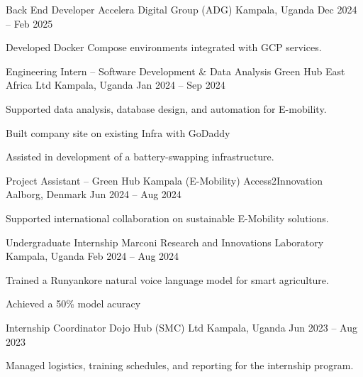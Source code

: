 \begin{cventries}
      \cventry
        {Back End Developer}
        {Accelera Digital Group (ADG)}
        {Kampala, Uganda}
        {Dec 2024 -- Feb 2025}
        {
          \begin{cvitems}
            \item Developed Docker Compose environments integrated with GCP services.
          \end{cvitems}
        }
    
      \cventry
        {Engineering Intern – Software Development \& Data Analysis}
        {Green Hub East Africa Ltd}
        {Kampala, Uganda}
        {Jan 2024 -- Sep 2024}
        {
          \begin{cvitems}
            \item Supported data analysis, database design, and automation for E-mobility.
            \item Built company site on existing Infra with GoDaddy
            \item Assisted in development of a battery-swapping infrastructure.
          \end{cvitems}
        }
    
      \cventry
        {Project Assistant – Green Hub Kampala (E-Mobility)}
        {Access2Innovation}
        {Aalborg, Denmark}
        {Jun 2024 -- Aug 2024}
        {
          \begin{cvitems}
            \item Supported international collaboration on sustainable E-Mobility solutions.
          \end{cvitems}
        }
    
      \cventry
        {Undergraduate Internship}
        {Marconi Research and Innovations Laboratory}
        {Kampala, Uganda}
        {Feb 2024 -- Aug 2024}
        {
          \begin{cvitems}
            \item Trained a Runyankore natural voice language model for smart agriculture.
            \item Achieved a 50\% model acuracy
          \end{cvitems}
        }
    
      \cventry
        {Internship Coordinator}
        {Dojo Hub (SMC) Ltd}
        {Kampala, Uganda}
        {Jun 2023 -- Aug 2023}
        {
          \begin{cvitems}
            \item Managed logistics, training schedules, and reporting for the internship program.
          \end{cvitems}
        }
      
    \end{cventries}